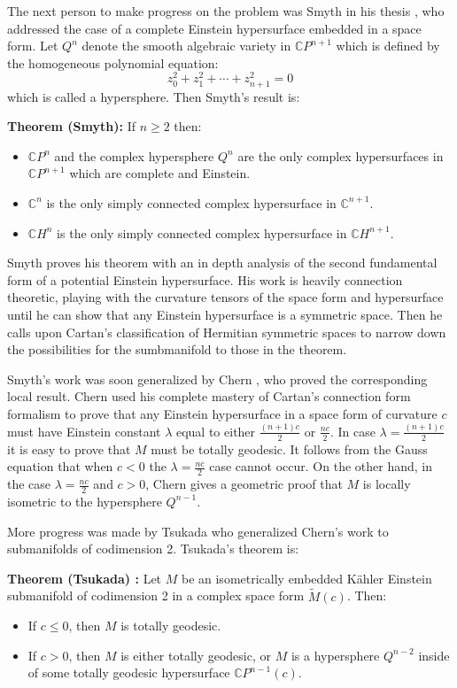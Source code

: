 \documentclass[11pt]{amsart}
\theoremstyle{definition}
\def \CP{ \mathbb{C}P }
\def \C{ \mathbb{C} }
\def \CH{ \mathbb{C}H }
\def \Mamb{ \mathcal{M} }
\def \Mamb{ \tilde{M} }
\begin{document}
The next person to make progress on the problem was Smyth in his thesis \cite{S}, who addressed the case of a complete Einstein hypersurface embedded in a space form.  Let $Q^{n}$ denote the smooth algebraic variety in $\CP^{n+1}$ which is defined by the homogeneous polynomial equation:
%
$$ z_0^2 + z_1^2 + \cdots + z_{n+1}^2 = 0 $$
%
which is called a hypersphere.  Then Smyth's result is:

{\bf Theorem (Smyth):} If $n \geq 2$ then:
%
\begin{itemize}
\item  $\CP^n$ and the complex hypersphere $Q^n$ are the only complex hypersurfaces in $\CP^{n+1}$ which are complete and Einstein.
\item  $\C^n$ is the only simply connected complex hypersurface in $\C^{n+1}$.
\item  $\CH^n$ is the only simply connected complex hypersurface in $\CH^{n+1}$.
\end{itemize}

Smyth proves his theorem with an in depth analysis of the second fundamental form of a potential Einstein hypersurface.  His work is heavily connection theoretic, playing with the curvature tensors of the space form and hypersurface until he can show that any Einstein hypersurface is a symmetric space.  Then he calls upon Cartan's classification of Hermitian symmetric spaces to narrow down the possibilities for the sumbmanifold to those in the theorem.  

Smyth's work was soon generalized by Chern \cite{Ch}, who proved the corresponding local result.  Chern used his complete mastery of Cartan's connection form formalism to prove that any Einstein hypersurface in a space form of curvature $c$ must have Einstein constant $\lambda$ equal to either $\frac{(n+1)c}{2}$ or $\frac{nc}{2}$.  In case $\lambda = \frac{(n+1)c}{2}$ it is easy to prove that $M$ must be totally geodesic.  It follows from the Gauss equation that when $c<0$ the $\lambda = \frac{nc}{2}$ case cannot occur.  On the other hand, in the case $\lambda = \frac{nc}{2}$ and $c>0$, Chern gives a geometric proof that $M$ is locally isometric to the hypersphere $Q^{n-1}$.

More progress was made by Tsukada \cite{T} who generalized Chern's work to submanifolds of codimension 2.  Tsukada's theorem is:

{\bf Theorem (Tsukada) : } Let $M$ be an isometrically embedded K\"{a}hler Einstein submanifold of codimension 2 in a complex space form $\Mamb(c)$.  Then:
%
\begin{itemize}
\item If $c \leq 0$, then $M$ is totally geodesic.
\item If $c > 0$, then $M$ is either totally geodesic, or $M$ is a hypersphere $Q^{n-2}$ inside of some totally geodesic hypersurface $\CP^{n-1}(c)$.
\end{itemize}
\end{document}
